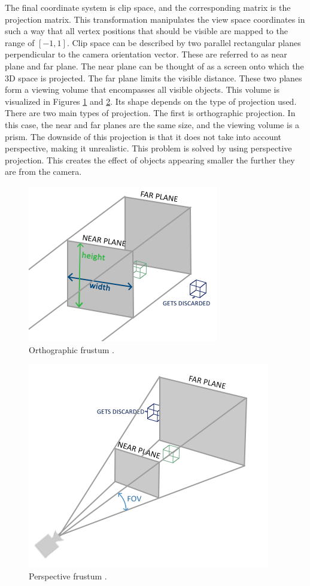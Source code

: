 \documentclass[
  digital,     %
  oneside,     %
  nosansbold,  %
  nocolorbold, %
  lof,         %
  lot,         %
]{fithesis4}
\begin{document}
The final coordinate system is clip space, and the corresponding matrix is the projection matrix.
This transformation manipulates the view space coordinates in such a way that all vertex positions
that should be visible are mapped to the range of $[-1, 1]$.
Clip space can be described by two parallel rectangular planes perpendicular to the camera orientation vector.
These are referred to as near plane and far plane. The near plane can be thought of as a screen onto which the 3D space is projected.
The far plane limits the visible distance. These two planes form a viewing volume that encompasses all visible objects.
This volume is visualized in Figures \ref{fig:orthographic-frustum} and \ref{fig:perspective-frustum}.
Its shape depends on the type of projection used.
There are two main types of projection. The first is orthographic projection. In this case, the near and far planes
are the same size, and the viewing volume is a prism. The downside of this projection is that it does not take into account
perspective, making it unrealistic. This problem is solved by using perspective projection.
This creates the effect of objects appearing smaller the further they are from the camera.
\begin{figure}[H]
    \centering
    \includegraphics[width=.5\textwidth]{images/orthographic_frustum.png}
    \caption{Orthographic frustum \cite{learnopengl-coord-systems}.}
    \label{fig:orthographic-frustum}
\end{figure}
\begin{figure}[H]
    \centering
    \includegraphics[width=.5\textwidth]{images/perspective_frustum.png}
    \caption{Perspective frustum \cite{learnopengl-coord-systems}.}
    \label{fig:perspective-frustum}
\end{figure}
\end{document}
